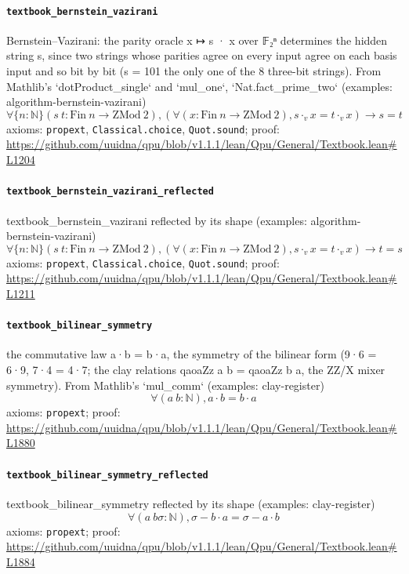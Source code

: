 \documentclass[11pt]{article}
\begin{document}
\paragraph{\texttt{textbook\_bernstein\_vazirani}}
Bernstein–Vazirani: the parity oracle x ↦ s · x over 𝔽₂ⁿ determines the hidden string s, since two strings whose parities agree on every input agree on each basis input and so bit by bit (s = 101 the only one of the 8 three-bit strings). From Mathlib's `dotProduct\_single` and `mul\_one`, `Nat.fact\_prime\_two` (examples: algorithm-bernstein-vazirani)
\[ \forall \{n : \mathbb{N}\} (s\ t : \mathrm{Fin}\ n \to \mathrm{ZMod}\ 2), (\forall (x : \mathrm{Fin}\ n \to \mathrm{ZMod}\ 2), s \cdot _{v} x = t \cdot _{v} x) \to s = t \]
\noindent axioms: \texttt{propext}, \texttt{Classical.choice}, \texttt{Quot.sound}; proof: \url{https://github.com/uuidna/qpu/blob/v1.1.1/lean/Qpu/General/Textbook.lean\#L1204}

\paragraph{\texttt{textbook\_bernstein\_vazirani\_reflected}}
textbook\_bernstein\_vazirani reflected by its shape (examples: algorithm-bernstein-vazirani)
\[ \forall \{n : \mathbb{N}\} (s\ t : \mathrm{Fin}\ n \to \mathrm{ZMod}\ 2), (\forall (x : \mathrm{Fin}\ n \to \mathrm{ZMod}\ 2), s \cdot _{v} x = t \cdot _{v} x) \to t = s \]
\noindent axioms: \texttt{propext}, \texttt{Classical.choice}, \texttt{Quot.sound}; proof: \url{https://github.com/uuidna/qpu/blob/v1.1.1/lean/Qpu/General/Textbook.lean\#L1211}

\paragraph{\texttt{textbook\_bilinear\_symmetry}}
the commutative law a·b = b·a, the symmetry of the bilinear form (9·6 = 6·9, 7·4 = 4·7; the clay relations qaoaZz a b = qaoaZz b a, the ZZ/X mixer symmetry). From Mathlib's `mul\_comm` (examples: clay-register)
\[ \forall (a\ b : \mathbb{N}), a \cdot b = b \cdot a \]
\noindent axioms: \texttt{propext}; proof: \url{https://github.com/uuidna/qpu/blob/v1.1.1/lean/Qpu/General/Textbook.lean\#L1880}

\paragraph{\texttt{textbook\_bilinear\_symmetry\_reflected}}
textbook\_bilinear\_symmetry reflected by its shape (examples: clay-register)
\[ \forall (a\ b \sigma : \mathbb{N}), \sigma - b \cdot a = \sigma - a \cdot b \]
\noindent axioms: \texttt{propext}; proof: \url{https://github.com/uuidna/qpu/blob/v1.1.1/lean/Qpu/General/Textbook.lean\#L1884}
\end{document}
